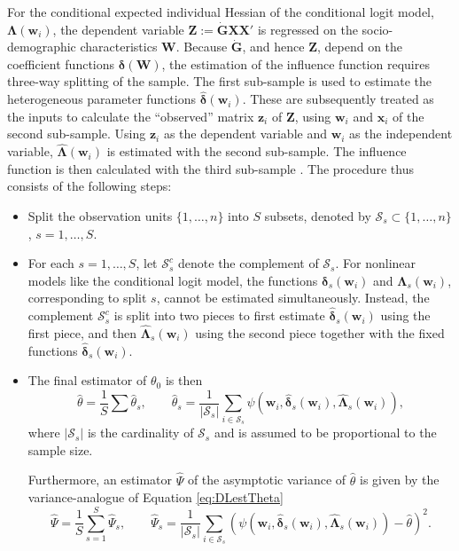 \documentclass[a4paper, 12pt]{article}
\begin{document}
For the conditional expected individual Hessian  of the conditional logit model, $\bm{\Lambda}(\bm{w}_i)$,  the dependent  variable $\bm{Z}:=\dot{\bm{G}}\bm{XX}'$ is regressed on the socio-demographic characteristics $\bm{W}$. Because $\dot{\bm{G}}$, and hence $\bm{Z}$, depend on the coefficient functions $\bm{\delta}(\bm{W})$, the estimation of the influence function requires three-way splitting of the sample. The first sub-sample is used to estimate the heterogeneous parameter functions $\hat{\bm{\delta}}(\bm{w}_i)$. These are subsequently treated as the inputs to calculate the ``observed'' matrix $\bm{z}_i$ of $\bm{Z}$, using $\bm{w}_i$ and $\bm{x}_i$ of the second sub-sample. Using $\bm{z}_i$ as the dependent variable and $\bm{w}_i$ as the independent variable, $\hat{\bm{\Lambda}}(\bm{w}_i)$ is estimated with the second sub-sample. The influence function is then calculated with the third sub-sample \cite{farrell2020}. The procedure thus consists of the following steps:
\begin{itemize}
\item[1.] Split the observation units $\{1, \ldots, n\}$ into $S$ subsets, denoted by $\mathcal{S}_s\subset\{1, \ldots, n\}$, $s=1, \ldots, S$.
\item[2.] For each $s=1, \ldots, S$, let $\mathcal{S}^c_s$ denote the complement  of $\mathcal{S}_s$.  For nonlinear models like the conditional logit model, the functions $\bm{\delta}_s(\bm{w}_i)$ and $\bm{\Lambda}_s(\bm{w}_i)$, corresponding to split $s$, cannot be estimated simultaneously.   Instead, the complement $\mathcal{S}_s^c$ is split into two pieces to first estimate $\hat{\bm{\delta}}_s(\bm{w}_i)$ using the first piece, and then $\hat{\bm{\Lambda}}_s(\bm{w}_i)$ using the second piece together with the fixed functions $\hat{\bm{\delta}}_s(\bm{w}_i)$.
\item[3.] The final estimator of $\theta_0$ is then
\begin{equation}\label{eq:DLestTheta}
\hat{\theta}=\frac{1}{S}\sum\limits\hat{\theta}_s,\quad\quad\hat{\theta}_s=\frac{1}{\vert\mathcal{S}_s\vert}\sum\limits_{i\in\mathcal{S}_s}\psi\left(\bm{w}_i, \hat{\bm{\delta}}_s(\bm{w}_i), \hat{\bm{\Lambda}}_s(\bm{w}_i)\right),
\end{equation}
where $\vert\mathcal{S}_s\vert$ is the cardinality of $\mathcal{S}_s$ and is assumed to be proportional to the sample size.

Furthermore, an estimator $\hat{\Psi}$ of the asymptotic variance of $\hat{\theta}$  is given by the variance-analogue of Equation \eqref{eq:DLestTheta}
\begin{equation}  \label{eq:DLestPsi}
\hat{\Psi}=\frac{1}{S}\sum\limits_{s=1}^S\hat{\Psi}_s,\quad\quad\hat{\Psi}_s=\frac{1}{\vert\mathcal{S}_s\vert}\sum\limits_{i\in\mathcal{S}_s}\left(\psi\left(\bm{w}_i, \hat{\bm{\delta}}_s(\bm{w}_i), \hat{\bm{\Lambda}}_s(\bm{w}_i)\right) - \hat{\theta}\right)^2.
\end{equation}
\end{itemize}
\end{document}
